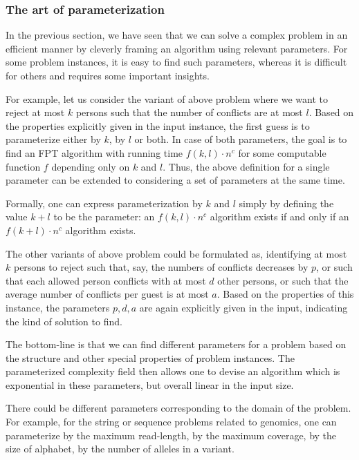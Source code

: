 \subsubsection{The art of parameterization}
In the previous section, we have seen that we can solve a complex problem in an efficient manner by cleverly framing an algorithm using relevant parameters.
For some problem instances, it is easy to find such parameters, whereas it is difficult for others and requires some important insights.

For example, let us consider the variant of above problem where we want to reject at most $k$ persons
such that the number of conflicts are at most $l$.
Based on the properties explicitly given in the input instance, the first guess is to parameterize either by $k$, by $l$ or both. 
In case of both parameters, the goal is to find an FPT algorithm with running time $f(k,l) \cdot n^c$ for some computable function $f$
depending only on $k$ and $l$. Thus, the above definition for a single parameter can be extended to considering a set of parameters at the same time.

\begin{definition}
Formally, one can express parameterization by $k$ and $l$ simply by defining the value $k+l$ to be the parameter:
an $f(k,l)\cdot n^c$ algorithm exists if and only if an $f(k+l) \cdot n^c$ algorithm exists.
\end{definition}

The other variants of above problem could be formulated as, identifying at most $k$ persons to reject such that,
say, the numbers of conflicts decreases by $p$, or such that each allowed person conflicts with at most $d$ other persons,
or such that the average number of conflicts per guest is at most $a$. Based on the properties of this instance, the parameters $p, d, a$ are again explicitly given in the input,
indicating the kind of solution to find. 

The bottom-line is that we can find different parameters for a problem based on the structure and other special properties of problem instances.
The parameterized complexity field then allows one to devise an algorithm which is exponential in these parameters, but overall linear in the input size.

There could be different parameters corresponding to the domain of the problem. For example, 
for the string or sequence problems related to genomics, one can parameterize by the maximum read-length, by the maximum coverage,
by the size of alphabet, by the number of alleles in a variant.

